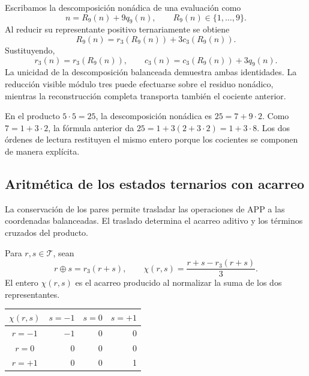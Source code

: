 Escribamos la descomposición nonádica de una evaluación como
\[
 n=R_9(n)+9q_9(n),\qquad R_9(n)\in\{1,\ldots,9\}.
\]
Al reducir su representante positivo ternariamente se obtiene
\[
 R_9(n)=r_3(R_9(n))+3c_3(R_9(n)).
\]
Sustituyendo,
\begin{equation}
 r_3(n)=r_3(R_9(n)),\qquad
 c_3(n)=c_3(R_9(n))+3q_9(n).
\label{trit:eq:compatibilidad39}
\end{equation}
La unicidad de la descomposición balanceada demuestra ambas identidades.
La reducción visible módulo tres puede efectuarse sobre el residuo
nonádico, mientras la reconstrucción completa transporta también el
cociente anterior.

En el producto \(5\cdot5=25\), la descomposición nonádica es
\(25=7+9\cdot2\). Como \(7=1+3\cdot2\), la fórmula anterior da
\(25=1+3(2+3\cdot2)=1+3\cdot8\). Los dos órdenes de lectura restituyen
el mismo entero porque los cocientes se componen de manera explícita.

\subsection{Aritmética de los estados ternarios con acarreo}
\label{trit:aritmetica}

La conservación de los pares permite trasladar las operaciones de APP a
las coordenadas balanceadas. El traslado determina el acarreo aditivo y
los términos cruzados del producto.

\begin{definicion}
Para \(r,s\in\mathcal T\), sean
\[
 r\oplus s=r_3(r+s),\qquad
 \chi(r,s)=\frac{r+s-r_3(r+s)}3.
\]
El entero \(\chi(r,s)\) es el acarreo producido al normalizar la suma de
los dos representantes.
\end{definicion}

\begin{tablacompleta}
\caption{Acarreo aditivo de la sección ternaria balanceada.}
\begin{tabular}{c|rrr}
\toprule
\(\chi(r,s)\)&\(s=-1\)&\(s=0\)&\(s=+1\)\\
\midrule
\(r=-1\)&$-1$&0&0\\
\(r=0\)&0&0&0\\
\(r=+1\)&0&0&1\\
\bottomrule
\end{tabular}
\end{tablacompleta}

